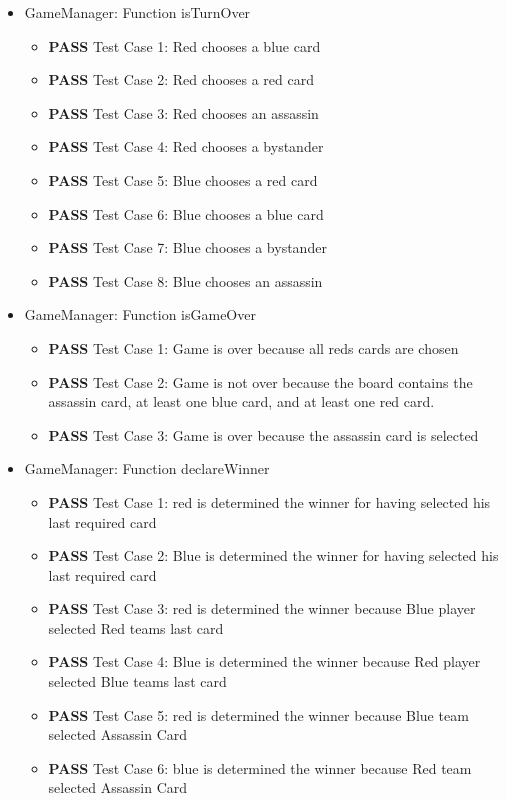 \documentclass[12pt]{article}
\begin{document}
\begin{itemize}

\item GameManager: Function isTurnOver

    \begin{itemize}
        \item \textbf{PASS} Test Case 1: Red chooses a blue card
        \item \textbf{PASS} Test Case 2: Red chooses a red card
        \item \textbf{PASS} Test Case 3: Red chooses an assassin
        \item \textbf{PASS} Test Case 4: Red chooses a bystander
        \item \textbf{PASS} Test Case 5: Blue chooses a red card
        \item \textbf{PASS} Test Case 6: Blue chooses a blue card
        \item \textbf{PASS} Test Case 7: Blue chooses a bystander
        \item \textbf{PASS} Test Case 8: Blue chooses an assassin
    \end{itemize}
    
\item GameManager: Function isGameOver

    \begin{itemize}
        \item \textbf{PASS} Test Case 1: Game is over because all reds cards are chosen
        \item \textbf{PASS} Test Case 2: Game is not over because the board contains the assassin card, at least one blue card, and at least one red card.
        \item \textbf{PASS} Test Case 3: Game is over because the assassin card is selected
    \end{itemize}

\item GameManager: Function declareWinner

    \begin{itemize}
        \item \textbf{PASS} Test Case 1: red is determined the winner for having selected his last required card
        \item \textbf{PASS} Test Case 2: Blue is determined the winner for having selected his last required card
        \item \textbf{PASS} Test Case 3: red is determined the winner because Blue player selected Red teams last card
        \item \textbf{PASS} Test Case 4: Blue is determined the winner because Red player selected Blue teams last card
        \item \textbf{PASS} Test Case 5: red is determined the winner because Blue team selected Assassin Card
        \item \textbf{PASS} Test Case 6: blue is determined the winner because Red team selected Assassin Card
    \end{itemize}


\end{itemize}
\end{document}
